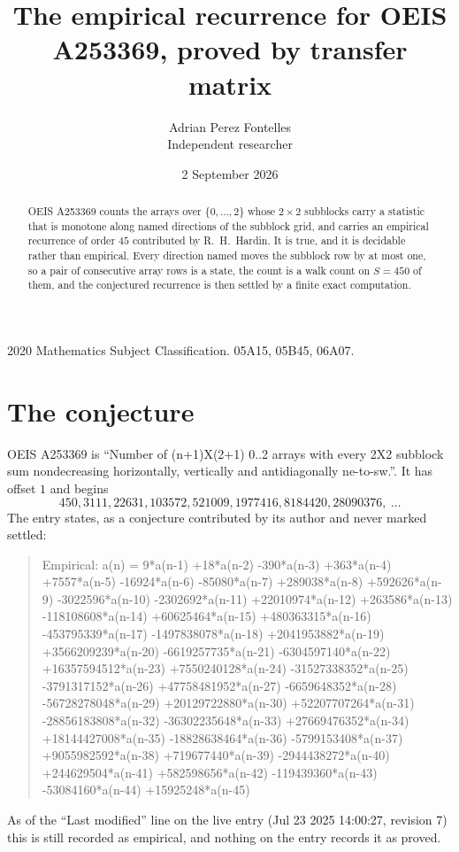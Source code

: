 \documentclass[11pt,a4paper]{article}
\title{The empirical recurrence for OEIS A253369, proved by transfer matrix}
\author{Adrian Perez Fontelles\\ \small Independent researcher}
\date{2 September 2026}
\theoremstyle{plain}
\theoremstyle{definition}
\begin{document}
\maketitle

\begin{abstract}
OEIS A253369 counts the arrays over $\{0,\dots,2\}$ whose $2\times2$ subblocks carry a
statistic that is monotone along named directions of the subblock grid, and carries an
empirical recurrence of order $45$ contributed by R.~H.~Hardin. It is true, and it is
decidable rather than empirical. Every direction named moves the subblock row by at most one,
so a pair of consecutive array rows is a state, the count is a walk count on $S=450$ of them,
and the conjectured recurrence is then settled by a finite exact computation.
\end{abstract}

\noindent\small 2020 Mathematics Subject Classification. 05A15, 05B45, 06A07.\normalsize

\section{The conjecture}

OEIS A253369 is ``Number of (n+1)X(2+1) 0..2 arrays with every 2X2 subblock sum nondecreasing horizontally, vertically and antidiagonally ne-to-sw.''. It has offset $1$ and begins
\[
450, 3111, 22631, 103572, 521009, 1977416, 8184420, 28090376,\ \dots
\]
The entry states, as a conjecture contributed by its author and never marked settled:
\begin{quote}
Empirical: a(n) = 9*a(n-1) +18*a(n-2) -390*a(n-3) +363*a(n-4) +7557*a(n-5) -16924*a(n-6) -85080*a(n-7) +289038*a(n-8) +592626*a(n-9) -3022596*a(n-10) -2302692*a(n-11) +22010974*a(n-12) +263586*a(n-13) -118108608*a(n-14) +60625464*a(n-15) +480363315*a(n-16) -453795339*a(n-17) -1497838078*a(n-18) +2041953882*a(n-19) +3566209239*a(n-20) -6619257735*a(n-21) -6304597140*a(n-22) +16357594512*a(n-23) +7550240128*a(n-24) -31527338352*a(n-25) -3791317152*a(n-26) +47758481952*a(n-27) -6659648352*a(n-28) -56728278048*a(n-29) +20129722880*a(n-30) +52207707264*a(n-31) -28856183808*a(n-32) -36302235648*a(n-33) +27669476352*a(n-34) +18144427008*a(n-35) -18828638464*a(n-36) -5799153408*a(n-37) +9055982592*a(n-38) +719677440*a(n-39) -2944438272*a(n-40) +244629504*a(n-41) +582598656*a(n-42) -119439360*a(n-43) -53084160*a(n-44) +15925248*a(n-45)
\end{quote}
As of the ``Last modified'' line on the live entry (Jul 23 2025 14:00:27, revision 7) this is still
recorded as empirical, and nothing on the entry records it as proved.
\end{document}
